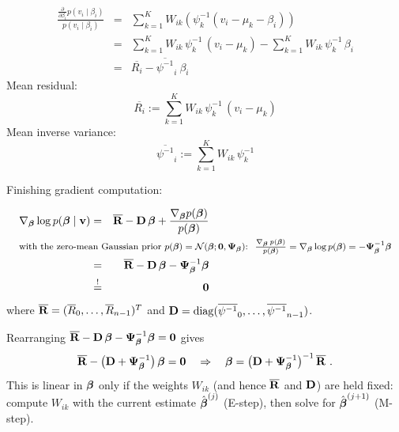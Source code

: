   {\footnotesize
  \begin{eqnarray*}
    \frac{\frac{\partial}{\partial \beta_i} p(v_i \mid \beta_i)}
         {p(v_i \mid \beta_i)} 
    &=& \sum_{k=1}^K W_{ik} \left( \psi_k^{-1} (v_i - \mu_k - \beta_i) \right) \\   
    &=& \sum_{k=1}^K W_{ik} \, \psi_k^{-1} \, (v_i - \mu_k) - \sum_{k=1}^K W_{ik} \, \psi_k^{-1} \, \beta_i \\   
    &=& \overline{R_i} - \overline{\psi^{-1}}_i ~\beta_i
  \end{eqnarray*}
  }
  Mean residual:
  {\footnotesize
  \begin{displaymath}
    \overline{R_i} := \sum_{k=1}^K W_{ik} \, \psi_k^{-1} \, (v_i - \mu_k)
  \end{displaymath}
  }
  Mean inverse variance:
  {\footnotesize
  \begin{displaymath}
    \overline{\psi^{-1}}_i := \sum_{k=1}^K W_{ik} \, \psi_k^{-1}
  \end{displaymath}
  }
     
 Finishing gradient computation:

  {\small
  \begin{eqnarray*}
    \nabla_{\vect \beta} \log p(\vect \beta \mid \vect v) 
      &=& \overline{\vect R} - \mat D\, \vect \beta + \frac{\nabla_{\vect \beta} p(\vect \beta)}{p(\vect \beta)} \\
      \noalign{\hbox{\footnotesize with the zero-mean Gaussian prior $p(\vect\beta)=\mathcal N(\vect\beta;\vect 0,\mat\Psi_{\vect\beta})$: $\;\frac{\nabla_{\vect\beta}\,p(\vect\beta)}{p(\vect\beta)}=\nabla_{\vect\beta}\log p(\vect\beta)=-\mat\Psi_{\vect\beta}^{-1}\vect\beta$}}
      &=& \overline{\vect R} - \mat D\, \vect \beta - \mat{\Psi}_{\vect{\beta}}^{-1} \vect \beta \\
      &\stackrel{!}{=}& \vect{0}
  \end{eqnarray*}
  }
  where $\overline{\bm{\mathrm{R}}}=(\overline{R}_0,\dots,\overline{R}_{n-1})^T$ and $\mathbf{D}=\mathrm{diag}(\overline{\psi^{-1}}_0,\dots,\overline{\psi^{-1}}_{n-1})$.

  Rearranging $\overline{\bm{\mathrm{R}}} - \mathbf{D}\,\bm{\mathrm{\beta}} - \mathbf{\Psi}_{\bm{\mathrm{\beta}}}^{-1}\bm{\mathrm{\beta}} = \bm{\mathrm{0}}$ gives
  {\small
  \[
    \overline{\bm{\mathrm{R}}} - \big(\mathbf{D} + \mathbf{\Psi}_{\bm{\mathrm{\beta}}}^{-1}\big)\,\bm{\mathrm{\beta}} = \bm{\mathrm{0}}
    \quad\Rightarrow\quad
    \bm{\mathrm{\beta}} = \big(\mathbf{D} + \mathbf{\Psi}_{\bm{\mathrm{\beta}}}^{-1}\big)^{-1}\,\overline{\bm{\mathrm{R}}}~.
  \]
  }
  This is linear in $\bm{\mathrm{\beta}}$ only if the weights $W_{ik}$ (and hence $\overline{\bm{\mathrm{R}}}$ and $\mathbf{D}$) are held fixed:
  compute $W_{ik}$ with the current estimate $\hat{\bm{\mathrm{\beta}}}^{(j)}$ (E-step), then solve for $\hat{\bm{\mathrm{\beta}}}^{(j+1)}$ (M-step).


